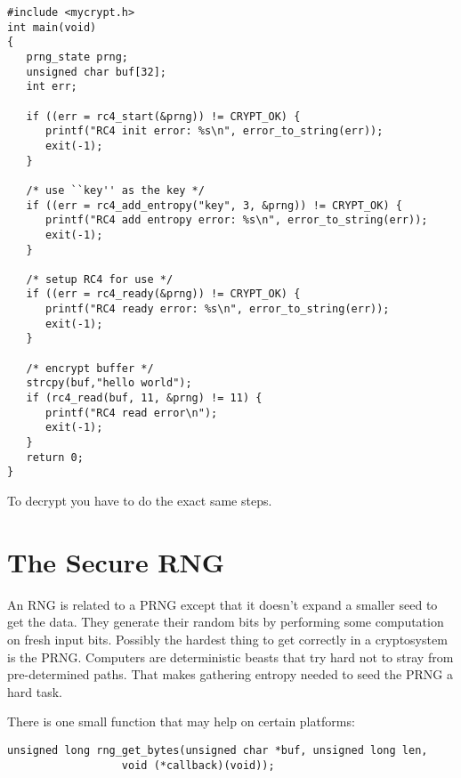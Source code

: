 \documentclass[b5paper]{book}
\begin{document}
\begin{small}
\begin{verbatim}
#include <mycrypt.h>
int main(void)
{
   prng_state prng;
   unsigned char buf[32];
   int err;

   if ((err = rc4_start(&prng)) != CRYPT_OK) {
      printf("RC4 init error: %s\n", error_to_string(err));
      exit(-1);
   }

   /* use ``key'' as the key */
   if ((err = rc4_add_entropy("key", 3, &prng)) != CRYPT_OK) {
      printf("RC4 add entropy error: %s\n", error_to_string(err));
      exit(-1);
   }

   /* setup RC4 for use */
   if ((err = rc4_ready(&prng)) != CRYPT_OK) {
      printf("RC4 ready error: %s\n", error_to_string(err));
      exit(-1);
   }

   /* encrypt buffer */
   strcpy(buf,"hello world");
   if (rc4_read(buf, 11, &prng) != 11) {
      printf("RC4 read error\n");
      exit(-1);
   }
   return 0;
}   
\end{verbatim}
\end{small}
To decrypt you have to do the exact same steps.  

\section{The Secure RNG}
An RNG is related to a PRNG except that it doesn't expand a smaller seed to get the data.  They generate their random bits
by performing some computation on fresh input bits.  Possibly the hardest thing to get correctly in a cryptosystem is the 
PRNG.  Computers are deterministic beasts that try hard not to stray from pre-determined paths.  That makes gathering 
entropy needed to seed the PRNG a hard task.  

There is one small function that may help on certain platforms:
\begin{verbatim}
unsigned long rng_get_bytes(unsigned char *buf, unsigned long len, 
                  void (*callback)(void));
\end{verbatim}
\end{document}
